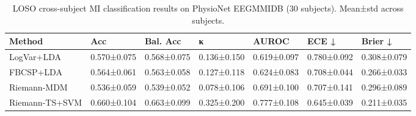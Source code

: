 \begin{table}
\centering
\caption{LOSO cross-subject MI classification results on PhysioNet EEGMMIDB (30 subjects). Mean±std across subjects.}
\label{tab:results}
\begin{tabular}{lllllll}
\toprule
        Method &         Acc &    Bal. Acc &           κ &       AUROC &       ECE ↓ &     Brier ↓ \\
\midrule
    LogVar+LDA & 0.570±0.075 & 0.568±0.075 & 0.136±0.150 & 0.619±0.097 & 0.780±0.092 & 0.308±0.079 \\
     FBCSP+LDA & 0.564±0.061 & 0.563±0.058 & 0.127±0.118 & 0.624±0.083 & 0.708±0.044 & 0.266±0.033 \\
   Riemann-MDM & 0.536±0.059 & 0.539±0.052 & 0.078±0.106 & 0.691±0.100 & 0.707±0.141 & 0.296±0.089 \\
Riemann-TS+SVM & 0.660±0.104 & 0.663±0.099 & 0.325±0.200 & 0.777±0.108 & 0.645±0.039 & 0.211±0.035 \\
\bottomrule
\end{tabular}
\end{table}
